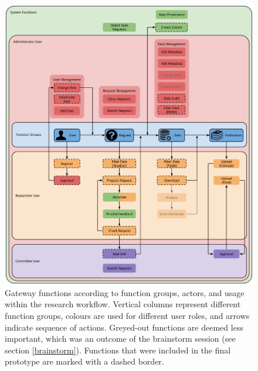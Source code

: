 \begin{figure}[!htb]
	\centering
	\includegraphics[width=1.0\linewidth]{images/functions-in-workflow}
	\caption{
		Gateway functions according to function groups, actors, and usage within the research workflow.
		Vertical columns represent different function groups, colours are used for different user roles, and arrows indicate sequence of actions.
		Greyed-out functions are deemed less important, which was an outcome of the brainstorm session (see section \ref{brainstorm}).
		Functions that were included in the final prototype are marked with a dashed border.
	}
	\label{fig:functions-workflow}
\end{figure}